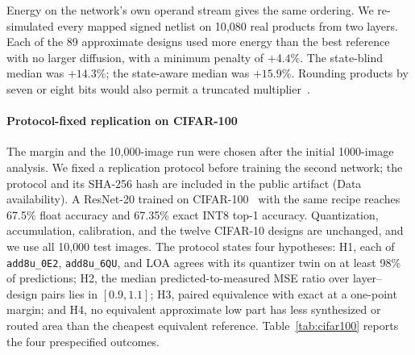 \documentclass[preprint,12pt,numbers]{elsarticle}
\theoremstyle{definition}
\begin{document}
Energy on the network's own operand stream gives the same ordering.
We re-simulated every mapped signed netlist on 10{,}080 real products
from two layers. Each of the 89 approximate designs used more energy
than the best reference with no larger diffusion, with a minimum penalty
of $+4.4\%$. The state-blind median was $+14.3\%$; the state-aware
median was $+15.9\%$. Rounding products by seven or eight bits would
also permit a
truncated multiplier~\cite{petra2010trunc}.

\paragraph{Protocol-fixed replication on CIFAR-100}
The margin and the 10{,}000-image run were chosen after the initial
1000-image analysis. We fixed a replication protocol before training
the second network; the protocol and its SHA-256 hash are included in the
public artifact (Data availability).
A ResNet-20 trained on CIFAR-100~\cite{krizhevsky2009cifar} with the
same recipe reaches 67.5\% float accuracy and 67.35\% exact INT8
top-1 accuracy. Quantization, accumulation, calibration,
and the twelve CIFAR-10 designs are unchanged, and we use all 10{,}000
test images. The
protocol states four hypotheses: H1, each of \texttt{add8u\_0E2},
\texttt{add8u\_6QU}, and LOA agrees with its quantizer twin on at least
98\% of predictions; H2, the median predicted-to-measured MSE ratio over
layer--design pairs lies in $[0.9,1.1]$; H3, paired equivalence with exact
at a one-point margin; and H4, no equivalent approximate low part has less
synthesized or routed area than the cheapest equivalent reference.
Table~\ref{tab:cifar100} reports the four prespecified outcomes.
\end{document}
